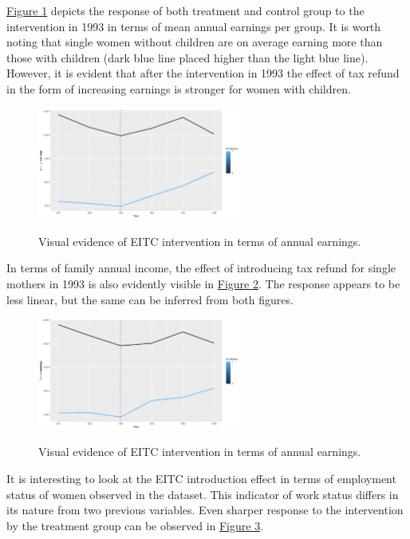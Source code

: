 \documentclass{article}
\begin{document}
\hyperref[fig:earnings]{Figure 1} depicts the response of both treatment and control group to the intervention in 1993 in terms of mean annual earnings per group. It is worth noting that single women without children are on average earning more than those with children (dark blue line placed higher than the light blue line). However, it is evident that after the intervention in 1993 the effect of tax refund in the form of increasing earnings is stronger for women with children. 

\begin{figure}[!htbp]
    \caption{Visual evidence of EITC intervention in terms of annual earnings.}
    \centering
    \includegraphics[width=0.6\textwidth]{lineEarnEffect.png}
    \label{fig:earnings}
\end{figure}

In terms of family annual income, the effect of introducing tax refund for single mothers in 1993 is also evidently visible in \hyperref[fig:family]{Figure 2}. The response appears to be less linear, but the same can be inferred from both figures.  

\begin{figure}[!htbp]
    \caption{Visual evidence of EITC intervention in terms of annual earnings.}
    \centering
    \includegraphics[width=0.6\textwidth]{lineFincEffect.png}
    \label{fig:family}
\end{figure}

It is interesting to look at the EITC introduction effect in terms of employment status of women observed in the dataset. This indicator of work status differs in its nature from two previous variables. Even sharper response to the intervention by the treatment group can be observed in \hyperref[fig:work]{Figure 3}. 
\end{document}
